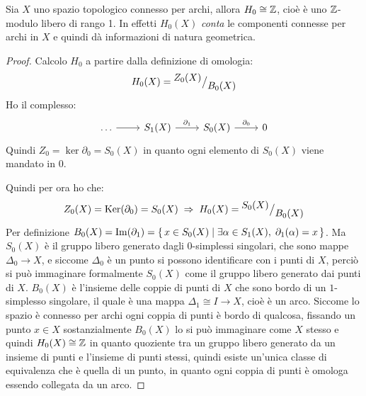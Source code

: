 \begin{proposition}
  Sia $ X $ uno spazio topologico connesso per archi, allora $ H_0 \cong \mathbb{Z} $, cioè è uno $ \mathbb{Z} $-modulo libero di rango 1.
  In effetti $ H_0(X) $ \emph{conta} le componenti connesse per archi in $ X $ e quindi dà informazioni di natura geometrica.
\end{proposition}
\begin{proof}
  Calcolo $ H_0 $ a partire dalla definizione di omologia:
  \[
    H_0(X) = {^{\textstyle Z_0(X)}\big/_{\textstyle B_0(X)}}
  \]
  Ho il complesso:
  \[
    \begin{tikzcd}
      \dots \arrow{r}{} & S_1(X) \arrow{r}{\partial_1} & S_0(X) \arrow{r}{\partial_0}  & 0
    \end{tikzcd}
  \]
  Quindi $ Z_0 = \ker{\partial_0} = S_0(X) $ in quanto ogni elemento di $ S_0(X) $ viene
  mandato in $ 0 $.

  Quindi per ora ho che:
  \[
    Z_0(X) = \mathrm{Ker}( \partial_0) = S_0(X) \; \Rightarrow \; H_0(X) = {^{\textstyle S_0(X)}\big/_{\textstyle B_0(X)}}
  \]
  Per definizione
  $ B_0(X) = \mathrm{Im}( \partial_1 ) = \set{ x \in S_0(X) | \exists \alpha \in S_1(X), \; \partial_1(\alpha) = x}
  $. %
  Ma $ S_0(X) $ è il gruppo libero generato dagli $ 0 $-simplessi singolari, che
  sono mappe $ \Delta_0 \to X $, e siccome $ \Delta_0 $ è un punto si possono identificare
  con i punti di $ X $, perciò si può immaginare formalmente $ S_0(X) $ come il
  gruppo libero generato dai punti di $ X $. $ B_0(X) $ è l'insieme delle coppie
  di punti di $ X $ che sono bordo di un $ 1 $-simplesso singolare, il quale è
  una mappa $ \Delta_1 \cong I \to X $, cioè è un arco. Siccome lo spazio è connesso per
  archi ogni coppia di punti è bordo di qualcosa, fissando un punto $ x \in X $
  sostanzialmente $ B_0(X) $ lo si può immaginare come $ X $ stesso e quindi
  $ H_0(X) \cong \mathbb{Z} $ in quanto quoziente tra un gruppo libero generato da un
  insieme di punti e l'insieme di punti stessi, quindi esiste un'unica classe di
  equivalenza che è quella di un punto, in quanto ogni coppia di punti è omologa
  essendo collegata da un arco.


\end{proof}
